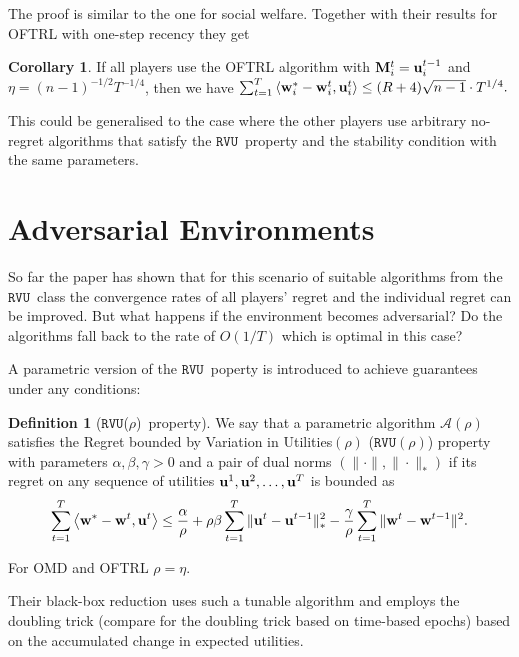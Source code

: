 \documentclass[a4paper]{article}
\theoremstyle{definition}
\newtheorem{defn}[theorem]{Definition}
\newtheorem{corollary}[theorem]{Corollary}
\newcommand{\myprop}{\ensuremath{\texttt{RVU}}}
\newcommand{\mst}{\ensuremath{w}}
\newcommand{\A}{\ensuremath{\mathcal{A}}}
\newcommand{\knob}{\ensuremath{\rho}}
\renewcommand{\vec}[1]{\ensuremath{{\bf #1}}}
\newcommand{\dotp}[2]{\ensuremath{\left\langle #1, #2 \right\rangle}}
\begin{document}
The proof is similar to the one for social welfare.
Together with their results for OFTRL with one-step recency they get

\begin{corollary}\label{cor:oftrl-bound}
If all players use the OFTRL algorithm with $\vec{M}_i^t =
\vec{u}_i^{t-1}$ and $\eta = (n-1)^{-1/2}T^{-1/4}$, then we have
$\sum_{t=1}^{T} \dotp{\vec{\mst}_i^*-\vec{\mst}_i^t}{ \vec{u}_i^t}\leq
(R+4)\sqrt{n-1}\cdot T^{1/4}.$
\end{corollary}

This could be generalised to the case where the other players use
arbitrary no-regret algorithms that satisfy the \myprop~property and
the stability condition with the same parameters.



\section{Adversarial Environments}
So far the paper has shown that for this scenario of suitable
algorithms from the \myprop~class the convergence rates of all players'
regret and the individual regret can be improved.
But what happens if the environment becomes adversarial?
Do the algorithms fall back to the rate of $O(1/T)$ which is optimal
in this case?

A parametric version of the \myprop~poperty is introduced to  achieve
guarantees under any conditions:

\begin{defn}[\myprop(\knob)~property]
  We say that a parametric algorithm $\A(\knob)$ satisfies the Regret
  bounded by Variation in Utilities$(\knob)$ ($\myprop(\knob)$)
  property with parameters $\alpha, \beta, \gamma > 0$ and a pair of
  dual norms $(\|\cdot\|, \|\cdot\|_*)$ if its regret on any sequence
  of utilities $\vec{u}^1, \vec{u}^2, \ldots, \vec{u}^T$ is bounded
  as \begin{equation} \sum_{t=1}^{T} \dotp{\vec{w}^*- \vec{w}^t}{\vec{u}^t} \leq \frac{\alpha}{\knob}
  +\knob\beta \sum_{t=1}^{T} \| \vec{u}^t - \vec{u}^{t-1}\|_*^2
  - \frac{\gamma}{\knob}\sum_{t=1}^{T} \|\vec{w}^{t}
  - \vec{w}^{t-1}\|^2.  \label{eqn:reg-form-param} \end{equation} \label{defn:alg-class-param}
\end{defn}

For OMD and OFTRL $ \knob = \eta$.

Their black-box reduction uses such a tunable algorithm and employs
the doubling trick (compare \cite[p.130]{Foundations} for the doubling
trick based on time-based epochs) based on the accumulated change in
expected utilities.
\end{document}
